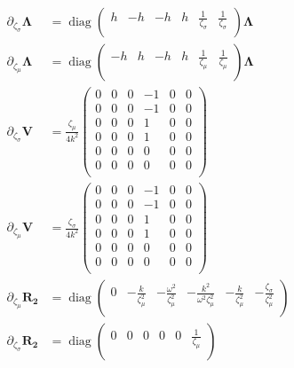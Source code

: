 \documentclass[a4paper,10pt]{article}
\DeclareMathOperator{\diag}{diag}
\begin{document}
\begin{align}
\partial_{\zeta_\sigma} \mathbf{\Lambda}&=\diag\left(
\begin{array}{cccccc}
 h & -h & -h & h & \frac{1}{\zeta _{\sigma }} & \frac{1}{\zeta _{\sigma }} \\
\end{array}
\right)\mathbf{\Lambda}\\
\partial_{\zeta_\mu} \mathbf{\Lambda}&=\diag\left(
\begin{array}{cccccc}
 -h & h & -h & h & \frac{1}{\zeta _{\mu }} & \frac{1}{\zeta _{\mu }} \\
\end{array}
\right)\mathbf{\Lambda}\\
\partial_{\zeta_\sigma}\mathbf{V} &= \frac{\zeta_\mu}{4k^2}\left(
\begin{array}{cccccc}
 0 & 0 & 0 & -1 & 0 & 0 \\
 0 & 0 & 0 & -1 & 0 & 0 \\
 0 & 0 & 0 & 1 & 0 & 0 \\
 0 & 0 & 0 & 1 & 0 & 0 \\
 0 & 0 & 0 & 0 & 0 & 0 \\
 0 & 0 & 0 & 0 & 0 & 0 \\
\end{array}
\right)\\
\partial_{\zeta_\mu}\mathbf{V} &= \frac{\zeta_\sigma}{4k^2}\left(
\begin{array}{cccccc}
 0 & 0 & 0 & -1 & 0 & 0 \\
 0 & 0 & 0 & -1 & 0 & 0 \\
 0 & 0 & 0 & 1 & 0 & 0 \\
 0 & 0 & 0 & 1 & 0 & 0 \\
 0 & 0 & 0 & 0 & 0 & 0 \\
 0 & 0 & 0 & 0 & 0 & 0 \\
\end{array}
\right)\\
\partial_{\zeta_\mu} \mathbf{R_2} &=\diag \left(
\begin{array}{cccccc}
 0 & -\frac{k}{\zeta _{\mu }^2} &  -\frac{\omega ^2}{\zeta _{\mu}^2} & -\frac{k^2}{\omega ^2 \zeta _{\mu }^2} &-\frac{k}{\zeta _{\mu}^2}  & -\frac{\zeta _{\sigma }}{\zeta _{\mu }^2} \\
\end{array}
\right)\\
\partial_{\zeta_\sigma} \mathbf{R_2} &=\diag\left(
\begin{array}{cccccc}
 0 & 0 & 0 & 0 & 0 & \frac{1}{\zeta _{\mu}} \\
\end{array}
\right)
\end{align}
\end{document}
